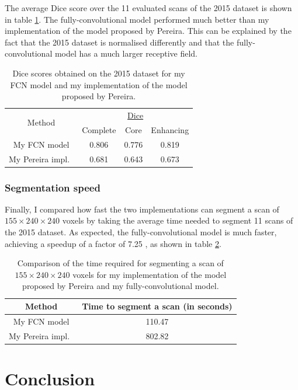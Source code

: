 \documentclass[12pt,a4paper,twoside,openright]{report}
\begin{document}
The average Dice score over the 11 evaluated scans of the 2015 dataset is shown in table \ref{table:2015_dice}. The fully-convolutional model performed much better than my implementation of the model proposed by Pereira. This can be explained by the fact that the 2015 dataset is normalised differently and that the fully-convolutional model has a much larger receptive field.
\begin{table}
\centering	
\begin{tabular}{c | c c c }
\multirow{2}{*}{Method} & \multicolumn{3}{c}{\underline{Dice}} \\
 & Complete & Core & Enhancing \\
 \hline
 My FCN model & 0.806 & 0.776 & 0.819\\
 My Pereira impl.\ & 0.681 & 0.643 & 0.673\\
\end{tabular}
\caption{Dice scores obtained on the 2015 dataset for my FCN model and my implementation of the model proposed by Pereira.}
\label{table:2015_dice}
\end{table}

\subsection{Segmentation speed}
Finally, I compared how fast the two implementations can segment a scan of $155 \times 240 \times 240$ voxels by taking the average time needed to segment 11 scans of the 2015 dataset. As expected, the fully-convolutional model is much faster, achieving a speedup of a factor of 7.25 , as shown in table \ref{table:time_comparison}.
\begin{table}[h]
\centering	
\begin{tabular}{c | c }
Method & Time to segment a scan (in seconds)\\
 \hline
 My FCN model & 110.47 \\
 My Pereira impl.\ & 802.82 \\
\end{tabular}
\caption{Comparison of the time required for segmenting a scan of $155 \times 240 \times 240$ voxels for my implementation of the model proposed by Pereira and my fully-convolutional model.}
\label{table:time_comparison}
\end{table}

\chapter{Conclusion}
\end{document}
